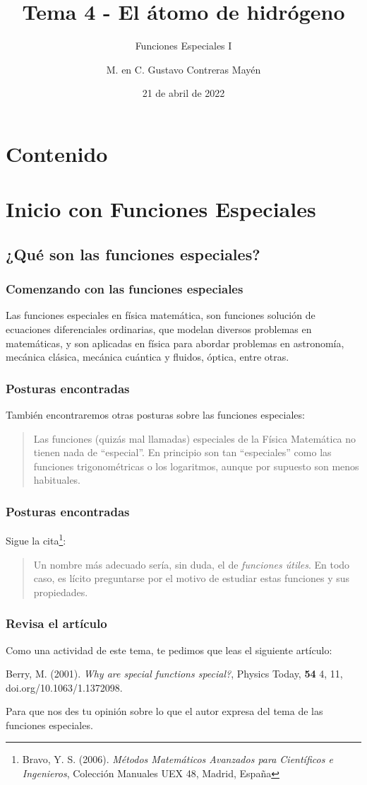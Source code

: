 \documentclass[12pt]{beamer}
\date{21 de abril de 2022}
\title{\large{Tema 4 - El átomo de hidrógeno}}
\subtitle{Funciones Especiales I}
\author{M. en C. Gustavo Contreras Mayén}
\begin{document}
\maketitle
\fontsize{14}{14}\selectfont
{}

\section*{Contenido}

\section{Inicio con Funciones Especiales}
\subsection{¿Qué son las funciones especiales?}

\begin{frame}
\frametitle{Comenzando con las funciones especiales}
Las funciones especiales en física matemática, son funciones solución de ecuaciones diferenciales ordinarias, que modelan diversos problemas en matemáticas, y son aplicadas en física para abordar problemas en astronomía, mecánica clásica, mecánica cuántica y fluidos, óptica, entre otras.
\end{frame}
\begin{frame}
\frametitle{Posturas encontradas}
También encontraremos otras posturas sobre las funciones especiales: 
\begin{quote}
Las funciones (quizás mal llamadas) especiales de la Física Matemática no tienen nada de \enquote{especial}. En principio son tan \enquote{especiales} como las funciones trigonométricas o los logaritmos, aunque por supuesto son menos habituales.
\end{quote}
\end{frame}
\begin{frame}
\frametitle{Posturas encontradas}
Sigue la cita\footnote{Bravo, Y. S. (2006). \textit{Métodos Matemáticos Avanzados para Científicos e Ingenieros}, Colección Manuales UEX 48, Madrid, España}:
\begin{quote}
Un nombre más adecuado sería, sin duda, el de \emph{funciones útiles}. En todo caso, es lícito preguntarse por el motivo de estudiar estas funciones y sus propiedades.
\end{quote}
\end{frame}
\begin{frame}
\frametitle{Revisa el artículo}
Como una actividad de este tema, te pedimos que leas el siguiente artículo: 
\begin{thebibliography}{X}
 Berry, M. (2001). \textit{Why are special functions special?}, Physics Today, \textbf{54} 4, 11, doi.org/10.1063/1.1372098.
\end{thebibliography}
Para que nos des tu opinión sobre lo que el autor expresa del tema de las funciones especiales.
\end{frame}
\end{document}
